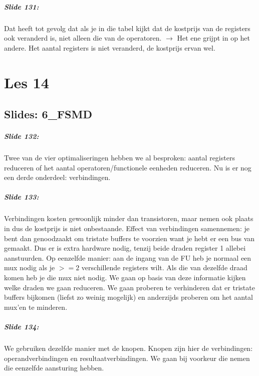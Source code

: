 \documentclass[10pt,a4paper]{book}
\begin{document}
\paragraph{Slide 131:} Dat heeft tot gevolg dat als je in die tabel kijkt dat de kostprijs van de registers ook veranderd is, niet alleen die van de operatoren. $\rightarrow$ Het ene grijpt in op het andere. Het aantal registers is niet veranderd, de kostprijs ervan wel.

\chapter{Les 14}

\section{Slides: 6\_FSMD}

\paragraph{Slide 132:} Twee van de vier optimaliseringen hebben we al besproken: aantal registers reduceren of het aantal operatoren/functionele eenheden reduceren. Nu is er nog een derde onderdeel: verbindingen.

\paragraph{Slide 133:} Verbindingen kosten gewoonlijk minder dan transistoren, maar nemen ook plaats in dus de kostprijs is niet onbestaande. Effect van verbindingen samennemen: je bent dan genoodzaakt om tristate buffers te voorzien want je hebt er een bus van gemaakt. Dus er is extra hardware nodig, tenzij beide draden register 1 allebei aanstuurden. Op eenzelfde manier: aan de ingang van de FU heb je normaal een mux nodig als je $>=2$ verschillende registers wilt. Als die van dezelfde draad komen heb je die mux niet nodig. We gaan op basis van deze informatie kijken welke draden we gaan reduceren. We gaan proberen te verhinderen dat er tristate buffers bijkomen (liefst zo weinig mogelijk) en anderzijds proberen om het aantal mux'en te minderen.

\paragraph{Slide 134:} We gebruiken dezelfde manier met de knopen. Knopen zijn hier de verbindingen: operandverbindingen en resultaatverbindingen. We gaan bij voorkeur die nemen die eenzelfde aansturing hebben.
\end{document}
